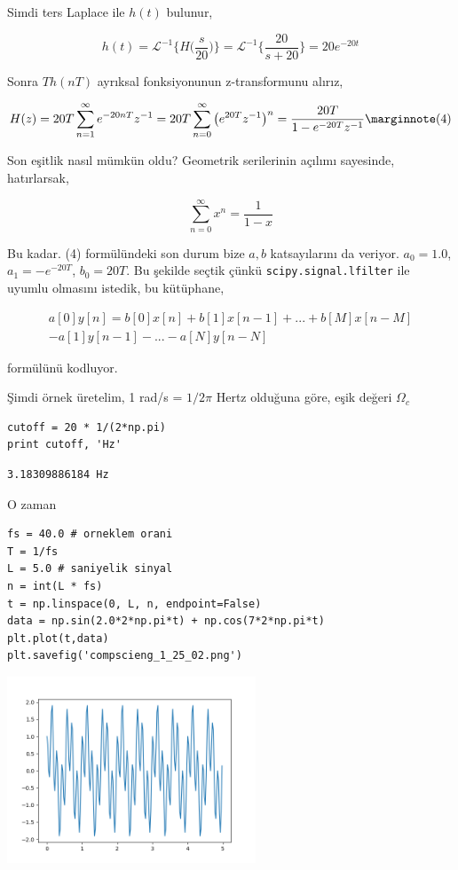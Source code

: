 \documentclass[12pt,fleqn]{article}\usepackage{../../common}
\begin{document}
Simdi ters Laplace ile $h(t)$ bulunur, 

$$ 
h(t) = \mathcal{L}^{-1} \bigg\{ H\bigg( \frac{s}{20} \bigg)  \bigg\} 
= \mathcal{L}^{-1} \bigg\{ \frac{20}{s + 20}  \bigg\}  
= 20 e^{-20 t}
$$

Sonra $Th(nT)$ ayrıksal fonksiyonunun z-transformunu alırız, 

$$
H(z) = 20 T \sum_{n=1}^{\infty} e^{-20 nT}z^{-1} 
= 20 T \sum_{n=0}^{\infty} \big( e^{20 T}z^{-1} \big)^n
= \frac{20T}{1 - e^{-20 T}z^{-1}} 
\mlabel{4}
$$

Son eşitlik nasıl mümkün oldu? Geometrik serilerinin açılımı sayesinde,
hatırlarsak, 

$$ \sum_{n=0}^{\infty} x^n = \frac{1}{1-x} $$

Bu kadar. (4) formülündeki son durum bize $a,b$ katsayılarını da
veriyor. $a_0 = 1.0$, $a_1=-e^{-20T}$, $b_0 = 20T$. Bu şekilde seçtik çünkü
\verb!scipy.signal.lfilter! ile uyumlu olmasını istedik, bu kütüphane,

\begin{eqnarray*}
a[0]y[n] = b[0]x[n] + b[1]x[n-1] + ... + b[M]x[n-M] \\
                    - a[1]y[n-1] - ... - a[N]y[n-N]
\end{eqnarray*}

formülünü kodluyor. 

Şimdi örnek üretelim, 1 rad/s = $1/2\pi$ Hertz olduğuna göre, eşik değeri
$\Omega_c$

\begin{verbatim}
cutoff = 20 * 1/(2*np.pi) 
print cutoff, 'Hz'
\end{verbatim}

\begin{verbatim}
3.18309886184 Hz
\end{verbatim}

O zaman

\begin{verbatim}
fs = 40.0 # orneklem orani
T = 1/fs
L = 5.0 # saniyelik sinyal
n = int(L * fs) 
t = np.linspace(0, L, n, endpoint=False)
data = np.sin(2.0*2*np.pi*t) + np.cos(7*2*np.pi*t) 
plt.plot(t,data)
plt.savefig('compscieng_1_25_02.png')
\end{verbatim}

\includegraphics[width=20em]{compscieng_1_25_02.png}
\end{document}
